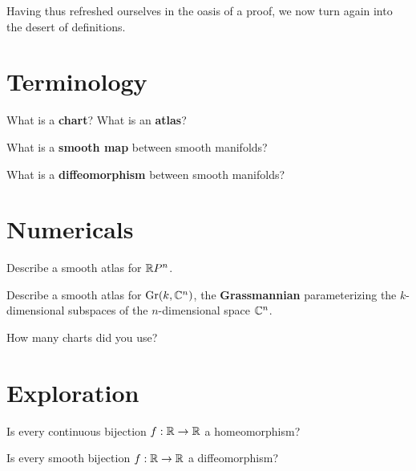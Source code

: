 \documentclass{homework}
\author{Jim Fowler}
\begin{document}
\maketitle

\begin{inspiration}
  Having thus refreshed ourselves in the oasis of a proof, we now turn
  again into the desert of definitions. 
\end{inspiration}

\section{Terminology}

\begin{problem}
  What is a \textbf{chart}?  What is an \textbf{atlas}?
\end{problem}

\begin{problem}
  What is a \textbf{smooth map} between smooth manifolds?

  What is a \textbf{diffeomorphism} between smooth manifolds?
\end{problem}

\section{Numericals}

\begin{problem}
  Describe a smooth atlas for $\mathbb{R}P^n$.
\end{problem}

\begin{problem}
  Describe a smooth atlas for $\operatorname{Gr}(k,\mathbb{C}^n)$, the \textbf{Grassmannian}
  parameterizing the $k$-dimensional subspaces of the $n$-dimensional
  space $\mathbb{C}^n$.

  How many charts did you use?
\end{problem}

\section{Exploration}

\begin{problem}
  Is every continuous bijection $f : \mathbb{R} \to \mathbb{R}$ a homeomorphism?

  Is every smooth bijection $f : \mathbb{R} \to \mathbb{R}$ a diffeomorphism?  
\end{problem}
\end{document}
